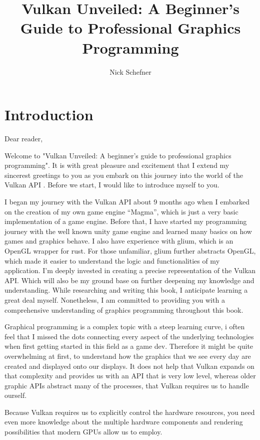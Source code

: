 \documentclass[12pt]{report} \usepackage{preamble}
\title{\textbf{\huge Vulkan Unveiled: A Beginner's Guide to Professional
Graphics Programming}} \author {Nick Schefner}
\begin{document}
 \maketitle

\tableofcontents

\chapter{Introduction}

Dear reader,

Welcome to "Vulkan Unveiled: A beginner's guide to professional graphics programming".
It is with great pleasure and excitement that I extend my sincerest greetings
to you as you embark on this journey into the world of the Vulkan \ac{API} .
Before we start, I would like to introduce myself to you.

I began my journey with the Vulkan \ac{API} about 9 months ago when I embarked
on the creation of my own game engine “Magma”, which is just a very basic
implementation of a game engine. Before that, I have
started my programming journey with the well known unity game engine
and learned many basics on how games and graphics behave. I also have
experience with glium, which is an OpenGL wrapper for rust. For those
unfamiliar, glium further abstracts OpenGL, which made it easier to
understand the logic and functionalities of my application.  I’m deeply
invested in creating a precise representation of the Vulkan \ac{API}.
Which will also be my ground base on further deepening my knowledge and
understanding.	While researching and writing this book, I anticipate
learning a great deal myself.  Nonetheless, I am committed to providing
you with a comprehensive understanding of graphics programming throughout
this book.

Graphical programming is a complex topic with a steep learning curve,
i often feel that I missed the dots connecting every aspect of the
underlying technologies when first getting started in this field as a
game dev. Therefore it might be quite overwhelming at first, to understand
how the graphics that we see every day are created and displayed onto
our displays. It does not help that Vulkan expands on that complexity
and provides us with an \ac{API} that is very low level, whereas older graphic
\ac{API}s abstract many of the processes, that Vulkan requires us to handle
ourself.

Because Vulkan requires us to explicitly control the hardware resources,
you need even more knowledge about the multiple hardware components and
rendering possibilities that modern \ac{GPU}s allow us to employ.
\end{document}
